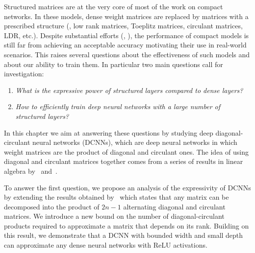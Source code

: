 Structured matrices are at the very core of most of the work on compact networks.
In these models, dense weight matrices are replaced by matrices with a prescribed structure (\eg, low rank matrices, Toeplitz matrices, circulant matrices, LDR, etc.).
Despite substantial efforts  (\eg, \citet{cheng2015exploration,moczulski2016acdc}), the performance of compact models is still far from achieving an acceptable accuracy motivating their use in real-world scenarios.
This raises several questions about the effectiveness of such models and about our ability to train them.
In particular two main questions call for investigation:
\begin{enumerate}
    \item \emph{What is the expressive power of structured layers compared to dense layers?}
    \item \emph{How to efficiently train deep neural networks with a large number of structured layers?}
\end{enumerate}
In this chapter we aim at answering these questions by studying deep diagonal-circulant neural networks (\aka DCNNs), which are deep neural networks in which weight matrices are the product of diagonal and circulant ones.
The idea of using diagonal and circulant matrices together comes from a series of results in linear algebra by~\citet{muller1998algorithmic} and~\citet{huhtanen2015factoring}.

To answer the first question, we propose an analysis of the expressivity of DCNNs by extending the results obtained by~\citet{huhtanen2015factoring} which states that any matrix can be decomposed into the product of $2n-1$ alternating diagonal and circulant matrices.
We introduce a new bound on the number of diagonal-circulant products required to approximate a matrix that depends on its rank.
Building on this result, we demonstrate that a DCNN with bounded width and small depth can approximate any dense neural networks with ReLU activations. 

